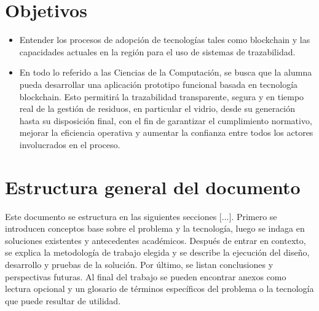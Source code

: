 \section{Objetivos}

\begin{itemize}
	\item Entender los procesos de adopción de tecnologías tales como blockchain y las capacidades actuales en la región para el uso de sistemas de trazabilidad.
	\item En todo lo referido a las Ciencias de la Computación, se busca que la alumna pueda desarrollar una aplicación prototipo funcional basada en tecnología blockchain. Esto permitirá la trazabilidad transparente, segura y en tiempo real de la gestión de residuos, en particular el vidrio, desde su generación hasta su disposición final, con el fin de garantizar el cumplimiento normativo, mejorar la eficiencia operativa y aumentar la confianza entre todos los actores involucrados en el proceso.
\end{itemize}

\section{Estructura general del documento}

Este documento se estructura en las siguientes secciones [...]. Primero se introducen conceptos base sobre el problema y la tecnología, luego se indaga en soluciones existentes y antecedentes académicos. Después de entrar en contexto, se explica la metodología de trabajo elegida y se describe la ejecución del diseño, desarrollo y pruebas de la solución. Por último, se listan conclusiones y perspectivas futuras. Al final del trabajo se pueden encontrar anexos como lectura opcional y un glosario de términos específicos del problema o la tecnología que puede resultar de utilidad.
